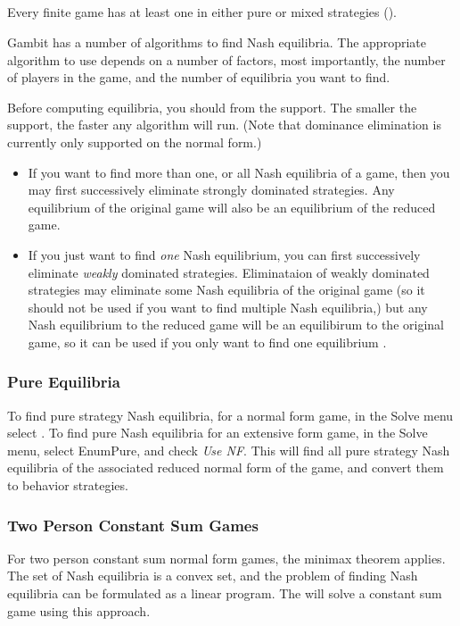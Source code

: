 \subsection{}\label{nashsec}
Every finite game has at least one  in either pure or mixed strategies (\cite{Nash:1950}).  

Gambit has a number of algorithms to find Nash equilibria.  
The appropriate algorithm to use 
depends on a number of factors, most importantly, the number of players in the 
game, and the number of equilibria you want to find. 

Before computing equilibria, you should 
 from 
the support.  The smaller the support, the faster any algorithm will run.  (Note that 
dominance elimination is currently only supported on the normal form.) 
\begin{itemize}
\item 
If you want to find more than one, or all Nash equilibria of a game, then you may first 
successively eliminate strongly dominated strategies.  Any equilibrium of the original 
game will also be an equilibrium of the reduced game. 
\item 
If you just want to find {\em one} Nash equilibrium, you can first successively eliminate 
{\em weakly} dominated strategies.  Eliminataion of weakly dominated strategies may 
eliminate some Nash equilibria of the original game (so it should not be used if you 
want to find multiple Nash equilibria,) but any Nash equilibrium to the reduced 
game will be an equilibirum to the original game, so it can be used if you only 
want to find one equilibrium .  
\end{itemize}

\subsubsection{Pure Equilibria}\label{purenashsec}
To find pure strategy Nash equilibria, for a normal form game, in the Solve 
menu select .  
To find pure Nash equilibria for an extensive 
form game,  in the Solve menu, select EnumPure, 
and check {\em Use NF}.  This will find 
all pure strategy Nash equilibria of the associated reduced normal form of 
the game, and convert them to behavior strategies.  

\subsubsection{Two Person Constant Sum Games}\label{csumsec}
For two person constant sum normal form 
games, the minimax theorem applies.  The set of 
Nash equilibria is a convex set, and the problem of finding Nash equilibria can be 
formulated as a linear program.  The  will solve a 
constant sum game 
using this approach.  

